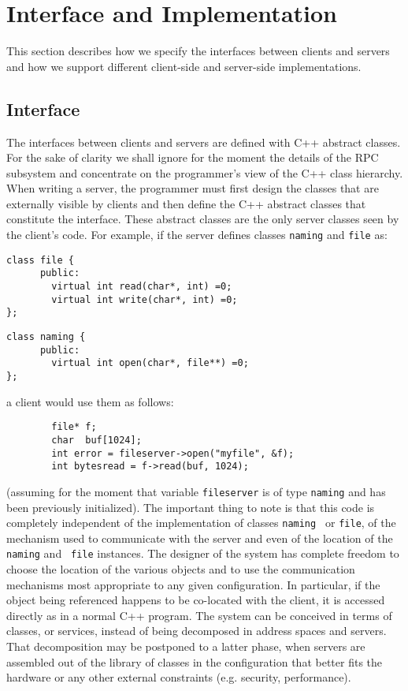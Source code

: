 \section{Interface and Implementation}
\label{sec3}

This section describes how we specify the interfaces between clients
and servers and how we support different client-side and server-side
implementations.

\subsection{Interface}

The interfaces between clients and servers are defined with C++ abstract
classes. For the sake of clarity we shall ignore for the moment the
details of the RPC subsystem and concentrate on the programmer's
view of the C++ class hierarchy. When writing a server, the
programmer must first design the classes that are externally visible
by clients and then define the C++ abstract classes that
constitute the interface.
These abstract classes are the only server classes seen by the
client's code. For example, if the server defines classes {\tt naming}
and {\tt file} as: 

{\small 
\begin{verbatim}
class file {
      public:
        virtual int read(char*, int) =0;
        virtual int write(char*, int) =0;
};
\end{verbatim}
}
{\small 
\begin{verbatim}
class naming {
      public:
        virtual int open(char*, file**) =0;
};
\end{verbatim}
}

\noindent 
a client would use them as follows:

{\small 
\begin{verbatim}
        file* f;
        char  buf[1024];
        int error = fileserver->open("myfile", &f);
        int bytesread = f->read(buf, 1024);
\end{verbatim}
}

\noindent 
(assuming for the moment that variable {\tt fileserver} is of
type {\tt naming} and has been previously initialized). The important
thing to note is that this code is completely independent of the
implementation of classes {\tt naming } or {\tt file}, of the mechanism
used to communicate 
with the server and even of the location of the {\tt naming} and {\tt
file} instances. The designer of the system has complete freedom to
choose the location of the various objects and to use the communication
mechanisms most appropriate to any given configuration. 
In particular, if the object being referenced happens to be co-located
with the client, it is accessed directly as in a normal C++
program. 
The system can be conceived in terms of classes, or services, instead
of being decomposed in address spaces and servers. That decomposition
may be postponed to a latter phase, when servers are assembled out of
the library of classes in the configuration that better fits the
hardware or any other external constraints (e.g. security,
performance). 

